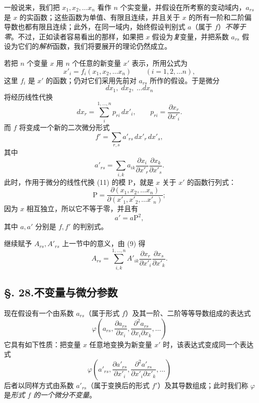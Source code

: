 一般说来，我们把 \(x_1,x_2,\ldots x_n\) 看作 \(n\) 个实变量，并假设在所考察的变动域内，\(a_{rs}\) 是 \(x\) 的实函数；这些函数为单值、有限且连续，并且关于 \(x\) 的所有一阶和二阶偏导数也都有限且连续；此外，在同一域内，始终假设判别式 \(a\)（属于 \(f\)）\emph{不等于零}。不过，正如读者容易看出的那样，如果把 \(x\) 假设为\emph{复}变量，并把系数 \(a_{rs}\) 假设为它们的\emph{解析}函数，我们将要展开的理论仍然成立。

若把 \(n\) 个变量 \(x\) 用 \(n\) 个任意的新变量 \(x'\) 表示，所用公式为
\[
x'_i=f_i(x_1,x_2,\ldots x_n)\qquad (i=1,2,\ldots n),
\]
这里 \(f_i\) 是 \(x'\) 的函数；仍对它们采用先前对 \(a_{rs}\) 所作的假设。于是微分
\[
dx_1,\;dx_2,\;\ldots dx_n
\]
将经历线性代换
\begin{equation}\tag{11}
dx_r=\sum_i^{1,\ldots,n}p_{ri}\,dx'_i,
\qquad
p_{ri}=\frac{\partial x_r}{\partial x'_i}.
\end{equation}
而 \(f\) 将变成一个新的二次微分形式
\begin{equation}\tag{12}
f'=\sum_{r,s}a'_{rs}\,dx'_r\,dx'_s,
\end{equation}
其中
\begin{equation}\tag{13}
a'_{rs}=\sum_{i,k}a_{ik}\frac{\partial x_i}{\partial x'_r}\frac{\partial x_k}{\partial x'_s}.
\end{equation}
此时，作用于微分的线性代换 (11) 的模 P，就是 \(x\) 关于 \(x'\) 的函数行列式：
\[
\mathrm P=\frac{\partial(x_1,x_2,\ldots x_n)}{\partial(x'_1,x'_2,\ldots x'_n)};
\]
因为 \(x\) 相互独立，所以它不等于零，并且有
\[
a'=a\mathrm P^2,
\]
其中 \(a,a'\) 分别是 \(f,f'\) 的判别式。

继续赋予 \(A_{rs},A'_{rs}\) 上一节中的意义，由 (9) 得
\begin{equation}\tag{14}
A_{rs}=\sum_{i,k}^{1,\ldots,n}A'_{ik}\frac{\partial x_r}{\partial x'_i}\frac{\partial x_s}{\partial x'_k}.
\end{equation}

\subsection*{\S. 28.\quad 不变量与微分参数}
现在假设有一个由系数 \(a_{rs}\)（属于形式 \(f\)）及其一阶、二阶等等导数组成的表达式
\[
\varphi\left(a_{rs},\frac{\partial a_{rs}}{\partial x_i},\frac{\partial^2a_{rs}}{\partial x_i\partial x_k},\ldots\right)
\]
它具有如下性质：把变量 \(x\) 任意地变换为新变量 \(x'\) 时，该表达式变成同一个表达式
\[
\varphi\left(a'_{rs},\frac{\partial a'_{rs}}{\partial x'_i},\frac{\partial^2a'_{rs}}{\partial x'_i\partial x'_k},\ldots\right)
\]
后者以同样方式由系数 \(a'_{rs}\)（属于变换后的形式 \(f'\)）及其导数组成；此时我们称 \(\varphi\) 是\emph{形式 \(f\) 的一个微分不变量}。

